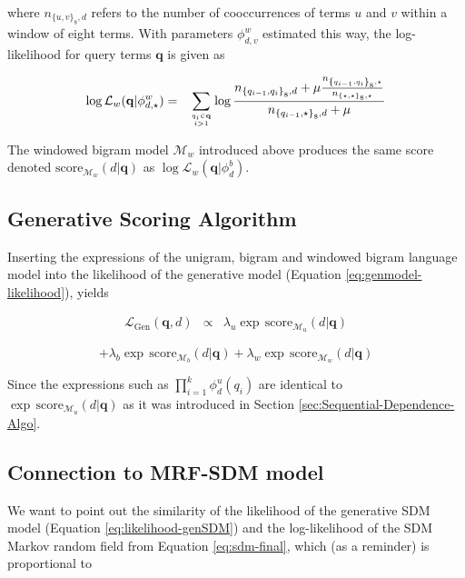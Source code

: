 \documentclass[]{article}
\begin{document}
where $n_{\{u,v\}_{8},d}$ refers to the number of cooccurrences of
terms $u$ and $v$ within a window of eight terms. With parameters
$\phi_{d,v}^{w}$ estimated this way, the log-likelihood for query
terms $\mathbf{q}$ is given as

\begin{eqnarray*}
\log\mathcal{L}_{w}(\mathbf{q}|\phi_{d,\star}^{w}) & = & \sum_{{q_{i}\in\mathbf{q}\atop i>1}}\log\frac{n_{\left\{ q_{i-1},q_{i}\right\} _{8},d}+\mu\frac{n_{\left\{ q_{i-1},q_{i}\right\} _{8},\star}}{n_{\left\{ \star,\star\right\} _{8},\star}}}{n_{\left\{ q_{i-1},\star\right\} _{8},d}+\mu}
\end{eqnarray*}

The windowed bigram model $\mathcal{M}_{w}$ introduced above produces
the same score denoted $\mbox{score}_{\mathcal{M}_{w}}(d|\mathbf{q})$
as $\log\mathcal{L}_{w}(\mathbf{q}|\phi_{d}^{b})$.

\subsection{Generative Scoring Algorithm}

Inserting the expressions of the unigram, bigram and windowed bigram
language model into the likelihood of the generative model (Equation
\ref{eq:genmodel-likelihood}), yields 

\begin{eqnarray}
\mathcal{L}_{\mbox{Gen}}(\mathbf{q},d) & \propto & \lambda_{u}\exp\,\mbox{score}_{\mathcal{M}_{u}}(d|\mathbf{q})\label{eq:likelihood-genSDM}
\end{eqnarray}

\[
+\lambda_{b}\exp\,\mbox{score}_{\mathcal{M}_{b}}(d|\mathbf{q})+\lambda_{w}\exp\,\mbox{score}_{\mathcal{M}_{w}}(d|\mathbf{q})
\]

Since the expressions such as $\prod_{i=1}^{k}\phi_{d}^{u}(q_{i})$
are identical to \\
 $\exp\,\mbox{score}_{\mathcal{M}_{u}}(d|\mathbf{q})$
as it was introduced in Section \ref{sec:Sequential-Dependence-Algo}.

\subsection{Connection to MRF-SDM model}

We want to point out the similarity of the likelihood of the generative
SDM model (Equation \ref{eq:likelihood-genSDM}) and the log-likelihood
of the SDM Markov random field from Equation \ref{eq:sdm-final},
which (as a reminder) is proportional to 
\end{document}
